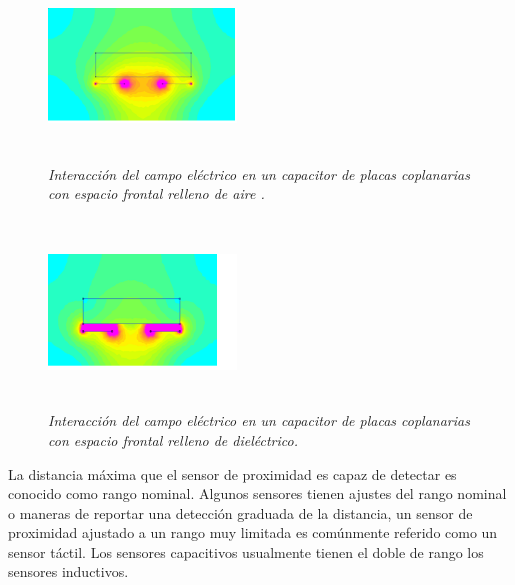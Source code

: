\begin{figure}[htb]
\begin{center}
\centering
	
	\includegraphics[width=5cm, height=5cm]{images/Capitulo_1/Interaccion_del_campo_electrico_en_un_capacitor_aire}
	\caption{\textit{Interacción del campo eléctrico en un capacitor de placas coplanarias con espacio frontal relleno de aire .}}
	\label{fig:system:example1}	
\end{center}
\end{figure}

\begin{figure}[htb]
\begin{center}
\centering
	\includegraphics[width=5cm, height=5cm]{images/Capitulo_1/Interaccion_del_campo_electrico_en_un_capacitor_aire_dielectrico}
	\caption{\textit{Interacción del campo eléctrico en un capacitor de placas coplanarias con espacio frontal relleno de dieléctrico.}}
	\label{fig:system:example1}	
\end{center}
\end{figure}

La distancia máxima que el sensor de proximidad es capaz de detectar es conocido como rango nominal. Algunos sensores tienen ajustes del rango nominal o maneras de reportar una detección graduada de la distancia, un sensor de proximidad ajustado a un rango muy limitada es comúnmente referido como un sensor táctil. Los sensores capacitivos usualmente tienen el doble de rango los sensores inductivos.\\



